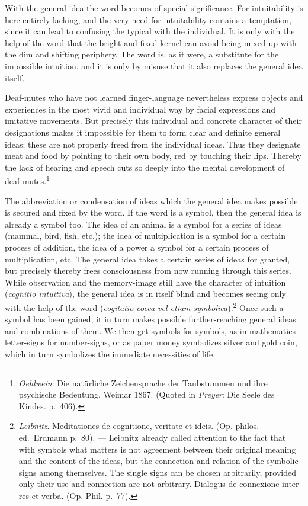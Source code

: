 \documentclass[12pt,a4paper]{book}
\newcommand{\opage}[1]{\marginnote{\footnotesize\textit{[#1]}}}
\begin{document}
With the general idea the word becomes of special significance. For
intuitability is here entirely lacking, and the very need for
intuitability contains a temptation, since it can lead to confusing the
typical with the individual. It is only with the help of the word that
the bright and fixed kernel can avoid being mixed up with the dim and
shifting periphery. The word is, as it were, a substitute for the
impossible intuition, and it is only by misuse that it also replaces the
general idea itself.

Deaf-mutes who have not learned finger-language nevertheless express
objects and experiences in the most vivid and individual way by facial
expressions and imitative movements. But precisely this individual and
concrete character of their designations makes it impossible for them
to form clear and definite general ideas; these are not properly freed
from the individual ideas. Thus they designate meat and food by pointing
to their own body, red by touching their lips. Thereby the lack
\opage{209}of hearing and speech cuts so deeply into the mental
development of deaf-mutes.\footnote{\emph{Oehlwein}: Die natürliche
Zeichensprache der Taubstummen und ihre psychische Bedeutung. Weimar
1867. (Quoted in \emph{Preyer}: Die Seele des Kindes. p.~406).}

The abbreviation or condensation of ideas which the general idea makes
possible is secured and fixed by the word. If the word is a symbol, then
the general idea is already a symbol too. The idea of an animal is a
symbol for a series of ideas (mammal, bird, fish, etc.); the idea of
multiplication is a symbol for a certain process of addition, the idea
of a power a symbol for a certain process of multiplication, etc. The
general idea takes a certain series of ideas for granted, but precisely
thereby frees consciousness from now running through this series. While
observation and the memory-image still have the character of intuition
(\textit{cognitio intuitiva}), the general idea is in itself blind and
becomes seeing only with the help of the word (\textit{cogitatio coeca
vel etiam
symbolica}).\footnote{\emph{Leibnitz}. Meditationes de cognitione,
veritate et ideis. (Op. philos. ed.\ Erdmann p.~80). --- Leibnitz
already called attention to the fact that with symbols what matters is
not agreement between their original meaning and the content of the
ideas, but the connection and relation of the symbolic signs among
themselves. The single signs can be chosen arbitrarily, provided only
their use and connection are not arbitrary. Dialogus de connexione
inter res et verba. (Op. Phil. p.~77).} Once such a symbol has been
gained, it in turn makes possible further-reaching general ideas and
combinations of them. We then get symbols for symbols, as in mathematics
letter-signs for number-signs, or as paper money symbolizes silver and
gold coin, which in turn symbolizes the immediate necessities of life.
\end{document}
